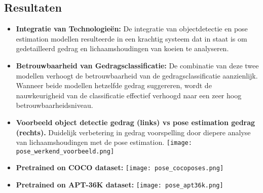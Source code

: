 \subsection{Resultaten}
\begin{itemize}
  \item \textbf{Integratie van Technologieën:} De integratie van objectdetectie en pose estimation modellen resulteerde in een krachtig systeem dat in staat is om gedetailleerd gedrag en lichaamshoudingen van koeien te analyseren.
  \item \textbf{Betrouwbaarheid van Gedragsclassificatie: } De combinatie van deze twee modellen verhoogt de betrouwbaarheid van de gedragsclassificatie aanzienlijk. Wanneer beide modellen hetzelfde gedrag suggereren, wordt de nauwkeurigheid van de classificatie effectief verhoogd naar een zeer hoog betrouwbaarheidsniveau.
  \item \textbf{Voorbeeld object detectie gedrag (links) vs pose estimation gedrag (rechts). } Duidelijk verbetering in gedrag voorspelling door diepere analyse van lichaamshoudingen met de pose estimation. 
  \newline \texttt{[image: pose\_werkend\_voorbeeld.png]}
  \item \textbf{Pretrained on COCO dataset:} \newline \texttt{[image: pose\_cocoposes.png]}
  \item \textbf{Pretrained on APT-36K dataset:} \newline \texttt{[image: pose\_apt36k.png]}
\end{itemize}